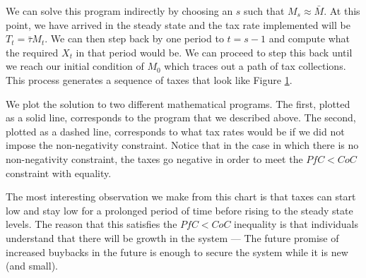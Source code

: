 We can solve this program indirectly by choosing an $s$ such that $M_s \approx \bar{M}$. At this
point, we have arrived in the steady state and the tax rate implemented will be
$T_t = \bar{\tau} M_t$. We can then step back by one period to $t = s - 1$ and compute what the
required $X_t$ in that period would be. We can proceed to step this back until we reach our initial
condition of $M_0$ which traces out a path of tax collections. This process generates a sequence of
taxes that look like Figure \ref{fig:dg_tax_growth}.

\begin{center}
  \begin{figure}[H]
    \label{fig:dg_tax_growth}
  \end{figure}
\end{center}

We plot the solution to two different mathematical programs. The first, plotted as a solid line,
corresponds to the program that we described above. The second, plotted as a dashed line,
corresponds to what tax rates would be if we did not impose the non-negativity constraint. Notice
that in the case in which there is no non-negativity constraint, the taxes go negative in order to
meet the $PfC < CoC$ constraint with equality.

The most interesting observation we make from this chart is that taxes can start low and stay low
for a prolonged period of time before rising to the steady state levels. The reason that this
satisfies the $PfC < CoC$ inequality is that individuals understand that there will be growth in
the system --- The future promise of increased buybacks in the future is enough to secure the system
while it is new (and small).

